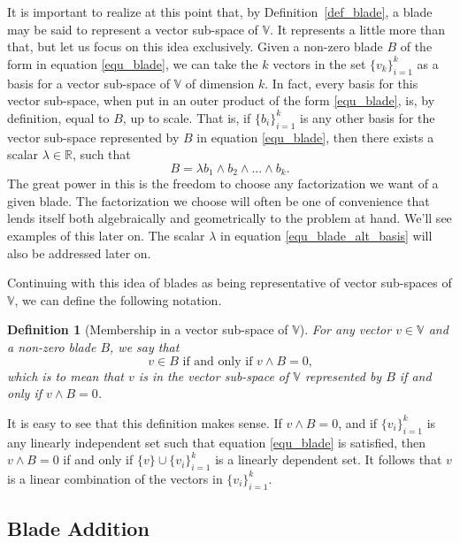 \documentclass[12pt]{article}
\newcommand{\V}{\mathbb{V}}
\newcommand{\R}{\mathbb{R}}
\newtheorem{definition}{Definition}[section]
\begin{document}
It is important to realize at this point that, by Definition~\ref{def_blade}, a blade
may be said to represent a vector sub-space of $\V$.  It represents a little more
than that, but let us focus on this idea exclusively.  Given a non-zero blade $B$ of the
form in equation \eqref{equ_blade}, we can take the $k$ vectors in the
set $\{v_k\}_{i=1}^k$ as a basis for a vector sub-space of $\V$ of
dimension $k$.  In fact, every basis for this vector sub-space, when put
in an outer product of the form \eqref{equ_blade}, is, by definition,
equal to $B$, up to scale.  That is, if $\{b_i\}_{i=1}^k$ is any other
basis for the vector sub-space represented by $B$ in equation \eqref{equ_blade},
then there exists a scalar $\lambda\in\R$, such that
\begin{equation}\label{equ_blade_alt_basis}
B = \lambda b_1\wedge b_2\wedge\dots\wedge b_k.
\end{equation}
The great power in this is the freedom to choose any factorization we want
of a given blade.  The factorization we choose will often be one of convenience
that lends itself both algebraically and geometrically to the problem at hand.
We'll see examples of this later on.  The scalar $\lambda$ in equation \eqref{equ_blade_alt_basis}
will also be addressed later on.

Continuing with this idea of blades as being representative of vector sub-spaces
of $\V$, we can define the following notation.
\begin{definition}[Membership in a vector sub-space of $\V$]
For any vector $v\in\V$ and a non-zero blade $B$, we say that
\begin{equation}
\mbox{$v\in B$ if and only if $v\wedge B=0$,}
\end{equation}
which is to mean that $v$ is in the vector sub-space of $\V$ represented by $B$
if and only if $v\wedge B=0$.
\end{definition}
It is easy to see that this definition makes sense.  If $v\wedge B=0$, and if $\{v_i\}_{i=1}^k$
is any linearly independent set such that equation \eqref{equ_blade} is
satisfied, then $v\wedge B=0$ if and only if $\{v\}\cup\{v_i\}_{i=1}^k$
is a linearly dependent set.  It follows that $v$ is a linear combination of
the vectors in $\{v_i\}_{i=1}^k$.

\subsection{Blade Addition}
\end{document}
